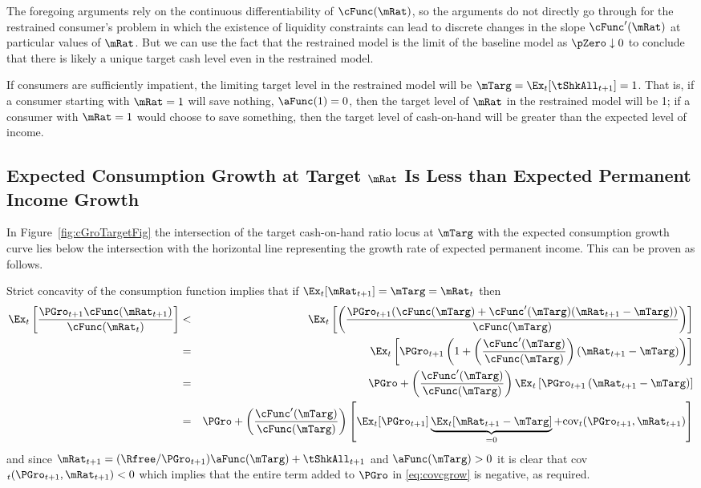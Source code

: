 \documentclass[titlepage]{\econtex}\providecommand{\texname}{BufferStockTheory}%
\begin{document}
{The foregoing arguments rely on the continuous differentiability of
$\cFunc(\mRat)$, so the arguments do not directly go through for the
restrained consumer's problem in which the existence of liquidity
constraints can lead to discrete changes in the slope
$\cFunc^{\prime}(\mRat)$ at particular values of $\mRat$. But we can
use the fact that the restrained model is the limit of the baseline
model as $\pZero \downarrow 0$ to conclude that there is likely a
unique target cash level even in the restrained model.

If consumers are sufficiently impatient, the limiting target level in the
restrained model will be $\mTarg = \Ex_{t}[{\tShkAll}_{t+1}] = 1$. That
is, if a consumer starting with $\mRat = 1$ will save nothing, ${\aFunc}(1)=0$,
then the target level of $\mRat$ in the restrained model will be 1; if a
consumer with $\mRat=1$ would choose to save something, then the target
level of cash-on-hand will be greater than the expected level of income.

\hypertarget{cGroLTpGro}{}
\subsection{Expected Consumption Growth at Target $\mRat$ Is Less than
Expected Permanent Income Growth}

\label{subsec:expcgrowth} In Figure~\ref{fig:cGroTargetFig} the intersection of
the target cash-on-hand ratio locus at $\mTarg$ with the expected consumption
growth curve lies below the intersection with the horizontal line
representing the growth rate of expected permanent income. This can be
proven as follows.

Strict concavity of the consumption function implies that if $\Ex_{t}[{\mRat}%
_{t+1}] = \mTarg = \mRat_{t}$ then
\begin{eqnarray}
\Ex_{t}\left[\frac{{\PGro}_{t+1} \cFunc({\mRat}_{t+1})}{\cFunc(\mRat_{t})}
\right] & < & \Ex_{t}\left[\left(\frac{{\PGro}_{t+1}
(\cFunc(\mTarg)+\cFunc^{\prime}(\mTarg)({\mRat}_{t+1}-\mTarg))}{\cFunc(\mTarg)}\right)\right]  \nonumber
\\
%
& = & \Ex_{t}\left[{\PGro}_{t+1} \left(1+\left(\frac{\cFunc^{\prime}(\mTarg)}{%
\cFunc(\mTarg)}\right)({\mRat}_{t+1}-\mTarg)\right)\right]  \nonumber  \\
& = & \PGro + \left(\frac{\cFunc^{\prime}(\mTarg)}{\cFunc(\mTarg)}\right)\Ex_{t}\left[ {\PGro}_{t+1}\left({\mRat}_{t+1}-\mTarg\right)\right]  \nonumber \\
& = & \PGro + \left(\frac{\cFunc^{\prime}(\mTarg)}{\cFunc(\mTarg)}\right)\left[
\Ex_{t}[ \PGro_{t+1}]\underbrace{\Ex_{t}[
{\mRat}_{t+1}-\mTarg]}_{=0}+\mbox{cov}_{t}( {\PGro}_{t+1},{\mRat}_{t+1})\right]
%
 \label{eq:covcgrow}
\end{eqnarray}
and since $\mRat_{t+1} = (\Rfree/\PGro_{t+1}) \aFunc(\mTarg)+\tShkAll_{t+1}$ and
$\aFunc(\mTarg)>0$ it is clear that
cov$_{t}({\PGro}_{t+1},{\mRat}_{t+1})<0$ which implies that
the entire term added to $\PGro$ in \eqref{eq:covcgrow} is negative, as
required.

}
\end{document}
